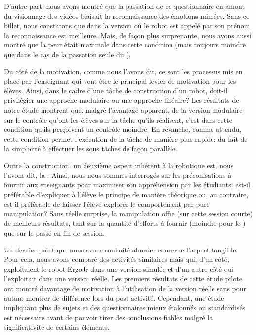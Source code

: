 \begin{concluPart}
D'autre part, nous avons montré que la passation de ce questionnaire en amont du visionnage des vidéos biaisait la reconnaissance des émotions mimées.
Sans ce billet, nous constatons que dans la version où le robot est appelé par son prénom  la reconnaissance est meilleure. Mais, de façon plus surprenante, nous avons aussi montré que la peur était maximale dans cette condition (mais toujours moindre que dans le cas de la passation seule du ).\par%
Du côté de la motivation, comme nous l'avons dit, ce sont les processus mis en place par l'enseignant qui vont être le principal levier de motivation pour les élèves. Ainsi, dans le cadre d'une tâche de construction d'un robot, doit-il privilégier une approche modulaire ou une approche linéaire? Les résultats de notre étude montrent que, malgré l'avantage apparent, de la version modulaire sur le contrôle qu'ont les élèves sur la tâche qu'ils réalisent, c'est dans cette condition qu'ils perçoivent  un contrôle moindre. En revanche, comme attendu, cette condition permet l'exécution de la tâche de manière plus rapide: du fait de la simplicité à effectuer les sous tâches de façon parallèle.\par%
Outre la construction, un deuxième aspect inhérent à la robotique est, nous l'avons dit, la . Ainsi, nous nous sommes interrogés sur les préconisations à fournir aux enseignants pour maximiser son appréhension par les étudiants: est-il préférable d'expliquer à l'élève le principe de manière théorique ou, au contraire, est-il préférable de laisser l'élève explorer le comportement par pure manipulation? Sans réelle surprise, la manipulation  offre (sur cette session courte) de meilleurs résultats, tant sur la quantité d'efforts à fournir (moindre pour le ) que sur le  passé en fin de session.\par%
Un dernier point que nous avons souhaité aborder concerne l'aspect tangible. Pour cela, nous avons comparé des activités similaires mais qui, d'un côté, exploitaient le robot ErgoJr dans une version simulée et d'un autre côté qui l'exploitait dans une version réelle. Les premiers résultats de cette étude pilote ont montré davantage de motivation à l'utilisation de la version réelle sans pour autant montrer de différence lors du  post-activité. Cependant, une étude impliquant plus de sujets et des questionnaires mieux étalonnés ou standardisés est nécessaire avant de pouvoir tirer des conclusions fiables malgré la significativité de certains éléments.\par%

\end{concluPart}
